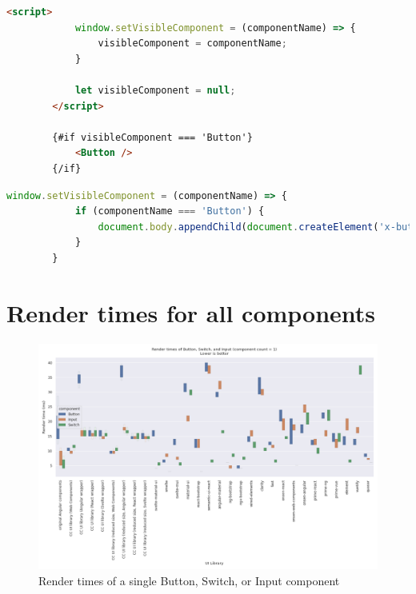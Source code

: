 \begin{lstlisting}[language={HTML},caption={The render-on-demand function in Svelte},label={lst:appendix:svelte-set-visible}]
		<script>
			window.setVisibleComponent = (componentName) => {
				visibleComponent = componentName;
			}
		
			let visibleComponent = null;
		</script>
		
		{#if visibleComponent === 'Button'}
			<Button />
		{/if}
		\end{lstlisting}

\begin{lstlisting}[language={JavaScript}, caption={The render-on-demand function in Web Components},label={lst:appendix:web-components-set-visible}]
		window.setVisibleComponent = (componentName) => {
			if (componentName === 'Button') {
				document.body.appendChild(document.createElement('x-button'));
			}
		}
		\end{lstlisting}

\section{Render times for all components}

\begin{figure}[htbp]
  \includegraphics[width=\columnwidth]{plots/render-time-all-big-1.png}
  \caption{Render times of a single Button, Switch, or Input component}
  \label{fig:appendix:render-time-cow-1}
  \centering
\end{figure}

